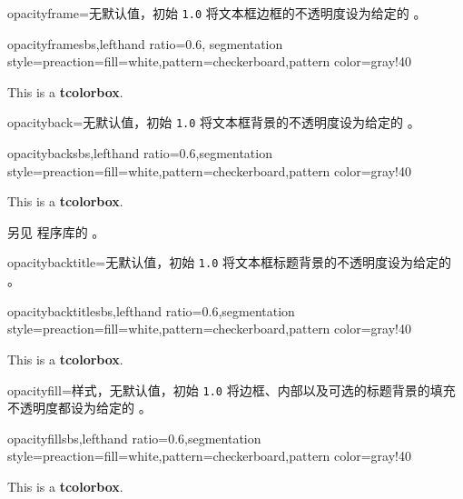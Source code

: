 \begin{docTcbKey}{opacityframe}{=}{无默认值，初始 \texttt{1.0}}
  将文本框边框的不透明度设为给定的 。
\begin{exdispExample*}{opacityframe}{sbs,lefthand ratio=0.6,
  segmentation style={preaction={fill=white},pattern=checkerboard,pattern color=gray!40}
  }
\begin{tcolorbox}[opacityframe=0.25,
  colframe=red]
This is a \textbf{tcolorbox}.
\end{tcolorbox}
\end{exdispExample*}
\end{docTcbKey}

\begin{docTcbKey}{opacityback}{=}{无默认值，初始 \texttt{1.0}}
  将文本框背景的不透明度设为给定的 。
\begin{exdispExample*}{opacityback}{sbs,lefthand ratio=0.6,segmentation style={preaction={fill=white},pattern=checkerboard,pattern color=gray!40}}
\begin{tcolorbox}[standard jigsaw,colframe=red,
  opacityframe=0.5, opacityback=0.5]
This is a \textbf{tcolorbox}.
\end{tcolorbox}
\end{exdispExample*}
\end{docTcbKey}

另见  程序库的 。

\begin{docTcbKey}{opacitybacktitle}{=}{无默认值，初始 \texttt{1.0}}
  将文本框标题背景的不透明度设为给定的 。
\begin{exdispExample*}{opacitybacktitle}{sbs,lefthand ratio=0.6,segmentation style={preaction={fill=white},pattern=checkerboard,pattern color=gray!40}}
\begin{tcolorbox}[standard jigsaw,colframe=red,
  opacityframe=0.5, opacitybacktitle=0.5,
  title filled, title=This is a title]
This is a \textbf{tcolorbox}.
\end{tcolorbox}
\end{exdispExample*}
\end{docTcbKey}


\begin{docTcbKey}{opacityfill}{=}{样式，无默认值，初始 \texttt{1.0}}
  将边框、内部以及可选的标题背景的填充不透明度都设为给定的 。
\begin{exdispExample*}{opacityfill}{sbs,lefthand ratio=0.6,segmentation style={preaction={fill=white},pattern=checkerboard,pattern color=gray!40}}
\begin{tcolorbox}[standard jigsaw,colframe=red,
  opacityfill=0.7, title=This is a title]
This is a \textbf{tcolorbox}.
\end{tcolorbox}
\end{exdispExample*}
\end{docTcbKey}

